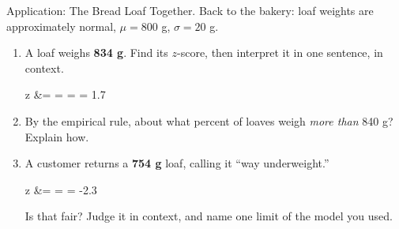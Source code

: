 \boxguard[10]
\begin{notesbox}{Application: The Bread Loaf}
Together. Back to the bakery: loaf weights are approximately normal, $\mu = 800$ g,
$\sigma = 20$ g.

\begin{enumerate}[label=\textbf{\alph*.}, leftmargin=1.8em, itemsep=3pt]
  \item A loaf weighs \textbf{834 g}. Find its $z$-score, then interpret it in one sentence, in
        context.
        \begin{work}
        z &=  =  =  = 1.7
        \end{work}
        \answerspace{1.2cm}{}
  \item By the empirical rule, about what percent of loaves weigh \emph{more than} 840 g?
        \blank{2.2cm} Explain how.
        \answerspace{1.2cm}{}
  \item A customer returns a \textbf{754 g} loaf, calling it ``way underweight.''
        \begin{work}
        z &=  =  = -2.3
        \end{work}
        Is that fair? Judge it in context, and name one limit of the model you used.
        \answerspace{2.0cm}{}
\end{enumerate}
\end{notesbox}


